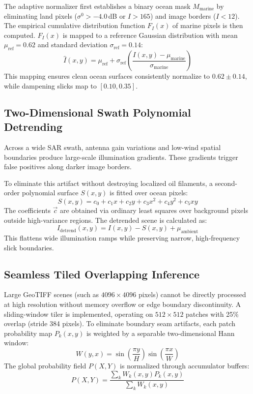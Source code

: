 \documentclass[conference]{IEEEtran}
\begin{document}
The adaptive normalizer first establishes a binary ocean mask $M_{\text{marine}}$ by eliminating land pixels ($\sigma^0 > -4.0$\,dB or $I > 165$) and image borders ($I < 12$). The empirical cumulative distribution function $F_I(x)$ of marine pixels is then computed. $F_I(x)$ is mapped to a reference Gaussian distribution with mean $\mu_{\text{ref}} = 0.62$ and standard deviation $\sigma_{\text{ref}} = 0.14$:
\begin{equation}
\hat{I}(x, y) = \mu_{\text{ref}} + \sigma_{\text{ref}} \left( \frac{I(x, y) - \mu_{\text{marine}}}{\sigma_{\text{marine}}} \right)
\label{eq:cdf_match}
\end{equation}
This mapping ensures clean ocean surfaces consistently normalize to $0.62 \pm 0.14$, while dampening slicks map to $[0.10, 0.35]$.

\subsection{Two-Dimensional Swath Polynomial Detrending}
Across a wide SAR swath, antenna gain variations and low-wind spatial boundaries produce large-scale illumination gradients. These gradients trigger false positives along darker image borders.

To eliminate this artifact without destroying localized oil filaments, a second-order polynomial surface $S(x, y)$ is fitted over ocean pixels:
\begin{equation}
S(x, y) = c_0 + c_1 x + c_2 y + c_3 x^2 + c_4 y^2 + c_5 x y
\label{eq:poly_surface}
\end{equation}
The coefficients $\vec{c}$ are obtained via ordinary least squares over background pixels outside high-variance regions. The detrended scene is calculated as:
\begin{equation}
I_{\text{detrend}}(x, y) = I(x, y) - S(x, y) + \mu_{\text{ambient}}
\label{eq:detrended_image}
\end{equation}
This flattens wide illumination ramps while preserving narrow, high-frequency slick boundaries.

\subsection{Seamless Tiled Overlapping Inference}
Large GeoTIFF scenes (such as $4096 \times 4096$ pixels) cannot be directly processed at high resolution without memory overflow or edge boundary discontinuity. A sliding-window tiler is implemented, operating on $512 \times 512$ patches with 25\% overlap (stride 384 pixels). To eliminate boundary seam artifacts, each patch probability map $P_k(x, y)$ is weighted by a separable two-dimensional Hann window:
\begin{equation}
W(y, x) = \sin\left(\frac{\pi y}{H}\right) \sin\left(\frac{\pi x}{W}\right)
\label{eq:hann_window}
\end{equation}
The global probability field $P(X, Y)$ is normalized through accumulator buffers:
\begin{equation}
P(X, Y) = \frac{\sum_k W_k(x, y) P_k(x, y)}{\sum_k W_k(x, y)}
\label{eq:prob_accum}
\end{equation}
\end{document}
